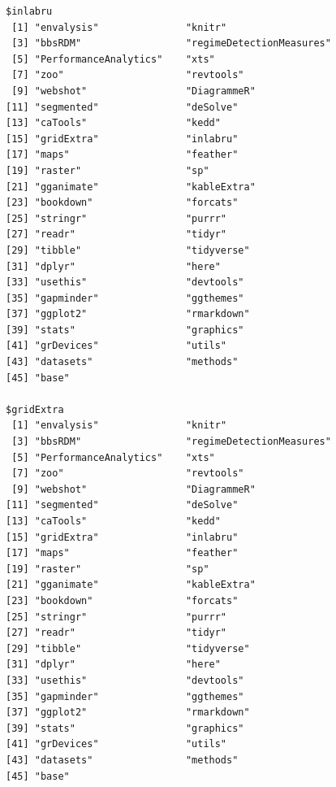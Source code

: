 \documentclass[12pt,twoside,openany]{reedthesis}
\begin{document}
\begin{verbatim}
$inlabru
 [1] "envalysis"               "knitr"                  
 [3] "bbsRDM"                  "regimeDetectionMeasures"
 [5] "PerformanceAnalytics"    "xts"                    
 [7] "zoo"                     "revtools"               
 [9] "webshot"                 "DiagrammeR"             
[11] "segmented"               "deSolve"                
[13] "caTools"                 "kedd"                   
[15] "gridExtra"               "inlabru"                
[17] "maps"                    "feather"                
[19] "raster"                  "sp"                     
[21] "gganimate"               "kableExtra"             
[23] "bookdown"                "forcats"                
[25] "stringr"                 "purrr"                  
[27] "readr"                   "tidyr"                  
[29] "tibble"                  "tidyverse"              
[31] "dplyr"                   "here"                   
[33] "usethis"                 "devtools"               
[35] "gapminder"               "ggthemes"               
[37] "ggplot2"                 "rmarkdown"              
[39] "stats"                   "graphics"               
[41] "grDevices"               "utils"                  
[43] "datasets"                "methods"                
[45] "base"                   

$gridExtra
 [1] "envalysis"               "knitr"                  
 [3] "bbsRDM"                  "regimeDetectionMeasures"
 [5] "PerformanceAnalytics"    "xts"                    
 [7] "zoo"                     "revtools"               
 [9] "webshot"                 "DiagrammeR"             
[11] "segmented"               "deSolve"                
[13] "caTools"                 "kedd"                   
[15] "gridExtra"               "inlabru"                
[17] "maps"                    "feather"                
[19] "raster"                  "sp"                     
[21] "gganimate"               "kableExtra"             
[23] "bookdown"                "forcats"                
[25] "stringr"                 "purrr"                  
[27] "readr"                   "tidyr"                  
[29] "tibble"                  "tidyverse"              
[31] "dplyr"                   "here"                   
[33] "usethis"                 "devtools"               
[35] "gapminder"               "ggthemes"               
[37] "ggplot2"                 "rmarkdown"              
[39] "stats"                   "graphics"               
[41] "grDevices"               "utils"                  
[43] "datasets"                "methods"                
[45] "base"                   


\end{verbatim}
\end{document}

